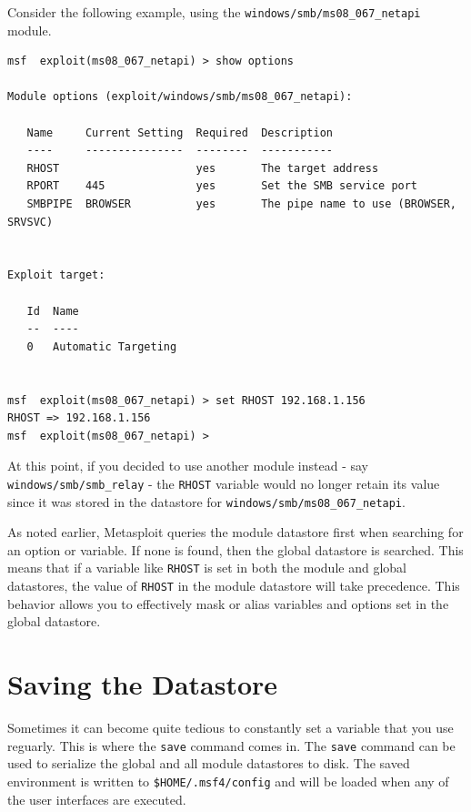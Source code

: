 \documentclass{report}
\begin{document}
\par
Consider the following example, using the \texttt{windows/smb/ms08\_067\_netapi}
module.

{\footnotesize
\begin{verbatim}
msf  exploit(ms08_067_netapi) > show options

Module options (exploit/windows/smb/ms08_067_netapi):

   Name     Current Setting  Required  Description
   ----     ---------------  --------  -----------
   RHOST                     yes       The target address
   RPORT    445              yes       Set the SMB service port
   SMBPIPE  BROWSER          yes       The pipe name to use (BROWSER, SRVSVC)


Exploit target:

   Id  Name
   --  ----
   0   Automatic Targeting


msf  exploit(ms08_067_netapi) > set RHOST 192.168.1.156
RHOST => 192.168.1.156
msf  exploit(ms08_067_netapi) >
\end{verbatim}
}


\par
At this point, if you decided to use another module instead - say
\texttt{windows/smb/smb\_relay} - the \texttt{RHOST} variable would no longer
retain its value since it was stored in the datastore for
\texttt{windows/smb/ms08\_067\_netapi}.

\par
As noted earlier, Metasploit queries the module datastore first when searching
for an option or variable. If none is found, then the global datastore is
searched. This means that if a variable like \texttt{RHOST} is set in both the
module and global datastores, the value of \texttt{RHOST} in the module
datastore will take precedence. This behavior allows you to effectively mask or
alias variables and options set in the global datastore.

    \section{Saving the Datastore}
    \label{ENV-SAVE}

\par
Sometimes it can become quite tedious to constantly set a variable that you
use reguarly. This is where the \texttt{save} command comes in. The
\texttt{save} command can be used to serialize the global and all module
datastores to disk. The saved environment is written to
\texttt{\$HOME/.msf4/config} and will be loaded when any of the user interfaces
are executed.
\end{document}
